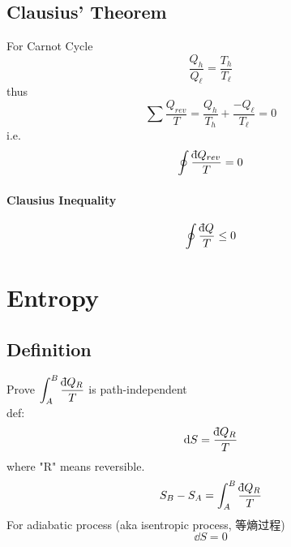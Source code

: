 \documentclass[UTF8]{ctexart} %
\newcommand{\dbar}{{\mathchar'26\mkern-11mu\mathrm{d}}}
\numberwithin{equation}{subsection}
\begin{document}
\subsection{}
\subsection{}
\subsection{Clausius' Theorem}
For Carnot Cycle
\begin{equation}\label{key}
\dfrac{Q_h}{Q_\ell} = \dfrac{T_h}{T_\ell}
\end{equation}
thus
\begin{equation}\label{key}
\sum\dfrac{Q_{rev}}{T} = \dfrac{Q_h}{T_h} + \dfrac{-Q_\ell}{T_\ell} = 0
\end{equation}
i.e.
\begin{equation}\label{key}
\oint\dfrac{\dbar Q_{rev}}{T} = 0
\end{equation}
\paragraph{Clausius Inequality}
\begin{equation}\label{key}
\oint\dfrac{\dbar Q}{T} \leq 0
\end{equation}

\section{Entropy}
\subsection{Definition}
Prove $\displaystyle\int_A^B \dfrac{\dbar Q_R}{T}$ is path-independent\\
def:
\begin{equation}\label{key}
\dd S = \dfrac{\dbar Q_R}{T}
\end{equation}
where "R" means reversible.
\begin{equation}\label{key}
S_B - S_A = \int_A^B \dfrac{\dbar Q_R}{T}
\end{equation}
For adiabatic process (aka isentropic process, 等熵过程)
\begin{equation}\label{key}
\dd S = 0
\end{equation}
\end{document}
